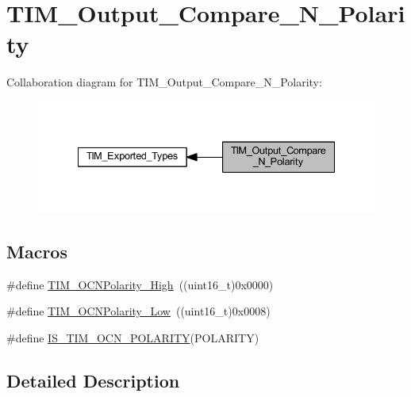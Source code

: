 \hypertarget{group___t_i_m___output___compare___n___polarity}{}\section{T\+I\+M\+\_\+\+Output\+\_\+\+Compare\+\_\+\+N\+\_\+\+Polarity}
\label{group___t_i_m___output___compare___n___polarity}
Collaboration diagram for T\+I\+M\+\_\+\+Output\+\_\+\+Compare\+\_\+\+N\+\_\+\+Polarity\+:
\nopagebreak
\begin{figure}[H]
\begin{center}
\leavevmode
\includegraphics[width=335pt]{group___t_i_m___output___compare___n___polarity}
\end{center}
\end{figure}
\subsection*{Macros}
\begin{DoxyCompactItemize}
\item 
\#define \hyperlink{group___t_i_m___output___compare___n___polarity_gaa62288888d4f6858bee6b3cd9086ae3f}{T\+I\+M\+\_\+\+O\+C\+N\+Polarity\+\_\+\+High}~((uint16\+\_\+t)0x0000)
\item 
\#define \hyperlink{group___t_i_m___output___compare___n___polarity_ga9582560b2e7dae2e8dc3b65909b0c9cf}{T\+I\+M\+\_\+\+O\+C\+N\+Polarity\+\_\+\+Low}~((uint16\+\_\+t)0x0008)
\item 
\#define \hyperlink{group___t_i_m___output___compare___n___polarity_gad7385dee1d2b6ce0daf23ceaac4439cd}{I\+S\+\_\+\+T\+I\+M\+\_\+\+O\+C\+N\+\_\+\+P\+O\+L\+A\+R\+I\+TY}(P\+O\+L\+A\+R\+I\+TY)
\end{DoxyCompactItemize}


\subsection{Detailed Description}


